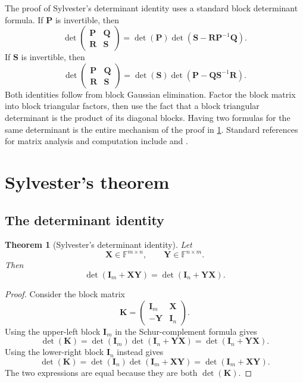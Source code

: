 \documentclass[11pt]{article}
\newcommand{\F}{\mathbb{F}}
\newcommand{\I}{\mathbf{I}}
\newcommand{\mat}[1]{\mathbf{#1}}
\newtheorem{theorem}{Theorem}[section]
\theoremstyle{definition}
\theoremstyle{remark}
\begin{document}
The proof of Sylvester's determinant identity uses a standard block determinant formula. If \(\mat{P}\) is invertible, then
\begin{equation}
  \det
  \begin{pmatrix}
    \mat{P}&\mat{Q}\\
    \mat{R}&\mat{S}
  \end{pmatrix}
  =
  \det(\mat{P})
  \det(\mat{S}-\mat{R}\mat{P}^{-1}\mat{Q}).
  \label{eq:schur-P}
\end{equation}
If \(\mat{S}\) is invertible, then
\begin{equation}
  \det
  \begin{pmatrix}
    \mat{P}&\mat{Q}\\
    \mat{R}&\mat{S}
  \end{pmatrix}
  =
  \det(\mat{S})
  \det(\mat{P}-\mat{Q}\mat{S}^{-1}\mat{R}).
  \label{eq:schur-S}
\end{equation}
Both identities follow from block Gaussian elimination. Factor the block matrix into block triangular factors, then use the fact that a block triangular determinant is the product of its diagonal blocks. Having two formulas for the same determinant is the entire mechanism of the proof in \cref{sec:sylvester}. Standard references for matrix analysis and computation include \textcite{horn2013matrix} and \textcite{golub2013matrix}.

\section{Sylvester's theorem}
\label{sec:sylvester}

\subsection{The determinant identity}

\begin{theorem}[Sylvester's determinant identity]
\label{thm:sylvester-determinant}
Let
\[
  \mat{X}\in\F^{m\times n},
  \qquad
  \mat{Y}\in\F^{n\times m}.
\]
Then
\begin{equation}
  \det(\I_m+\mat{X}\mat{Y})
  =
  \det(\I_n+\mat{Y}\mat{X}).
  \label{eq:sylvester-determinant}
\end{equation}
\end{theorem}

\begin{proof}
Consider the block matrix
\begin{equation}
  \mat{K}
  =
  \begin{pmatrix}
    \I_m&\mat{X}\\
    -\mat{Y}&\I_n
  \end{pmatrix}.
  \label{eq:block-K}
\end{equation}
Using the upper-left block \(\I_m\) in the Schur-complement formula gives
\[
  \det(\mat{K})
  =\det(\I_m)
   \det(\I_n+\mat{Y}\mat{X})
  =\det(\I_n+\mat{Y}\mat{X}).
\]
Using the lower-right block \(\I_n\) instead gives
\[
  \det(\mat{K})
  =\det(\I_n)
   \det(\I_m+\mat{X}\mat{Y})
  =\det(\I_m+\mat{X}\mat{Y}).
\]
The two expressions are equal because they are both \(\det(\mat{K})\).
\end{proof}
\end{document}
